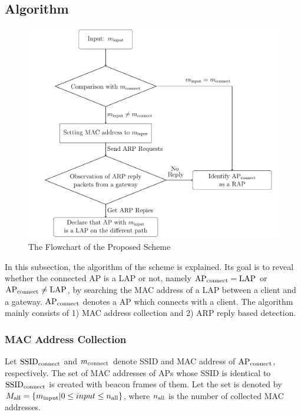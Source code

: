 \documentclass[conference]{IEEEtran}
\newcommand{\SSID}{\rm SSID_{connect}}
\newcommand{\tarAP}{\rm AP_{connect}}
\newcommand{\tarMAC}{m_{\rm connect}}
\begin{document}
\subsection{Algorithm} \label{sec:alg}
\begin{figure}[t]
    \begin{center}
        \includegraphics[scale=0.42]{flowchart/flowchart.pdf}
        \caption{The Flowchart of the Proposed Scheme}
        \label{fig:flowchart}
    \end{center}
\vspace{-2zh}
\end{figure}
In this subsection, the algorithm of the scheme is explained.
Its goal is to reveal whether the connected AP is a LAP or not, namely $\tarAP = LAP$ or $\tarAP \ne LAP$, by searching the MAC address of a LAP between a client and a gateway.
$\tarAP$ denotes a AP which connects with a client.
The algorithm mainly consists of 1) MAC address collection and 2) ARP reply based detection.

\subsubsection{MAC Address Collection}
Let $\SSID$ and $\tarMAC$ denote SSID and MAC address of $\tarAP$, respectively.
The set of MAC addresses of APs whose SSID is identical to $\SSID$  is created with beacon frames of them.
Let the set is denoted by $M_{\rm all}=\{m_{\rm i nput}|0\le input \le n_{\rm al l}  \}$, where $n_{\rm all}$ is the number of collected MAC addresses.
\end{document}
